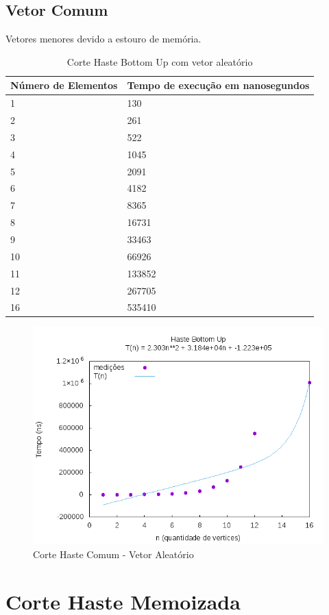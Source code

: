 \documentclass[12pt,a4paper,twoside]{report}
\begin{document}
\subsection{Vetor Comum}
Vetores menores devido a estouro de memória.
\begin{table}[H]
\centering
\caption{Corte Haste Bottom Up com vetor aleatório}
\label{my-label}
\begin{tabular}{|l|l|}
\hline
\multicolumn{1}{|c|}{\textbf{Número de Elementos}} & \multicolumn{1}{c|}{\textbf{Tempo de execução em nanosegundos}} \\ \hline
1 & 130 \\ \hline
2 & 261 \\ \hline
3 & 522 \\ \hline
4 & 1045 \\ \hline
5 & 2091 \\ \hline
6 & 4182 \\ \hline
7 & 8365 \\ \hline
8 & 16731 \\ \hline
9 & 33463 \\ \hline
10 & 66926 \\ \hline
11 & 133852 \\ \hline
12 & 267705 \\ \hline
16 & 535410 \\ \hline
\end{tabular}
\end{table}
\begin{figure}[H]
    \centering
    \includegraphics[width=0.7\linewidth]{graficos/CorteHasteComum/HasteBU.png}
  \caption{Corte Haste Comum - Vetor Aleatório}
\end{figure}

\section{Corte Haste Memoizada}
\end{document}
